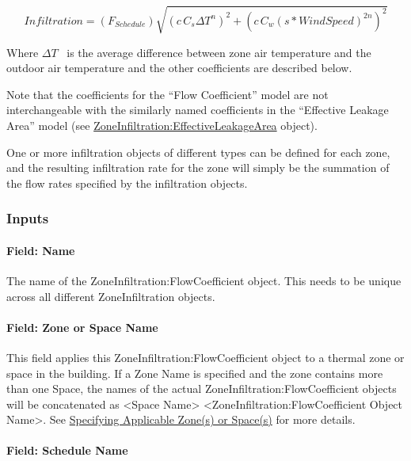 \begin{equation}
Infiltration = \left( {{F_{Schedule}}} \right)\sqrt {{{\left( {c\,{C_s}\Delta {T^n}} \right)}^2} + {{\left( {c\,{C_w}{{\left( {s * WindSpeed} \right)}^{2n}}} \right)}^2}}
\end{equation}

Where \(\Delta T\) ~is the average difference between zone air temperature and the outdoor air temperature and the other coefficients are described below.

Note that the coefficients for the ``Flow Coefficient'' model are not interchangeable with the similarly named coefficients in the ``Effective Leakage Area'' model (see \hyperref[zoneinfiltrationeffectiveleakagearea]{ZoneInfiltration:EffectiveLeakageArea} object).

One or more infiltration objects of different types can be defined for each zone, and the resulting infiltration rate for the zone will simply be the summation of the flow rates specified by the infiltration objects.

\subsubsection{Inputs}\label{inputs-2-005}

\paragraph{Field: Name}\label{field-name-2-004}

The name of the ZoneInfiltration:FlowCoefficient object. This needs to be unique across all different ZoneInfiltration objects.

\paragraph{Field: Zone or Space Name}\label{field-zone-name-1-001}

This field applies this ZoneInfiltration:FlowCoefficient object to a thermal zone or space in the building. If a Zone Name is specified and the zone contains more than one Space, the names of the actual ZoneInfiltration:FlowCoefficient objects will be concatenated as \textless{}Space Name\textgreater{} \textless{}ZoneInfiltration:FlowCoefficient Object Name\textgreater{}. See \hyperref[specifying-applicable-zones-or-spaces]{Specifying Applicable Zone(s) or Space(s)} for more details.

\paragraph{Field: Schedule Name}\label{field-schedule-name-2}

